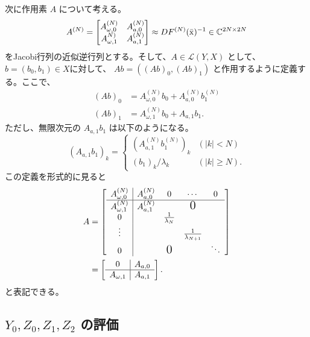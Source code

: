次に作用素 $A$ について考える。 
$$
    A^{(N)} = 
    \begin{bmatrix}
    A_{\omega,0}^{(N)} & A_{a,0}^{(N)} \\
    A_{\omega,1}^{N)} & A_{a,1}^{(N)}
    \end{bmatrix}
    \approx DF^{(N)}(\bar{\mathrm x})^{-1} \in \mathbb{C}^{2N \times 2N}
$$
をJacobi行列の近似逆行列とする。そして、$A \in \mathcal{L}(Y,X)$ として、$b = (b_0, b_1 ) \in X$に対して、 $Ab = ((Ab)_0, (Ab)_1)$ と作用するように定義する。ここで、
    \begin{align*}
    (Ab)_0 &= A_{\omega,0}^{(N)}b_0 + A_{a,0}^{(N)}b_1^{(N)} \\
    (Ab)_1 &= A_{\omega,1}^{(N)}b_0 + A_{a,1}b_1.
    \end{align*}
ただし、無限次元の $A_{a,1}b_1$ は以下のようになる。
$$
    (A_{a,1} b_1 )_k = 
    \begin{cases}
    (A_{a,1}^{(N)}b_1^{(N)})_k &(|k| < N) \\
    (b_1)_k / \lambda_k &(|k| \ge N).
    \end{cases}
$$
この定義を形式的に見ると
\begin{align*}
    A &=
    \left[
    \begin{array}{c|cccc}
    A^{(N)}_{\omega , 0} & A^{(N)}_{a,0} & 0 & \cdots & 0 \\
    \hline
    A^{(N)}_{\omega ,1} & A^{(N)}_{a,1} &  & \mbox{\Large{0}} &\\
    0 & &\frac1{\lambda_{N}} &  & \\
    \vdots & & & \frac1{\lambda_{N+1}} & \\
    0 & & \mbox{\Large{0}} & & \ddots
    \end{array}
    \right]\\
    &=
    \left[
    \begin{array}{c|c}
    0 & A_{a,0} \\
    \hline 
    A_{\omega, 1} & A_{a,1}
    \end{array}
    \right].
\end{align*}
と表記できる。

\subsection{$Y_0, Z_0, Z_1, Z_2$ の評価}

